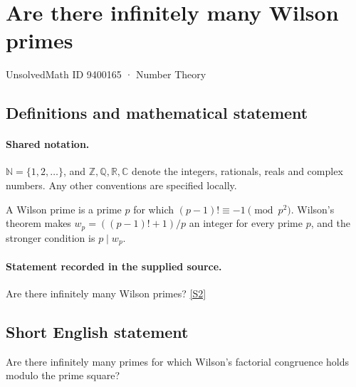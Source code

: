 \documentclass[11pt]{article}
\newcommand{\sref}[2]{\hyperlink{source:#1:#2}{[S#2]}}
\begin{document}
\setcounter{section}{9400164}
\section{Are there infinitely many Wilson primes}\label{9400165}
{\small\sffamily UnsolvedMath ID 9400165 · Number Theory}
\subsection{Definitions and mathematical statement}

\paragraph{Shared notation.}$\mathbb N=\{1,2,\ldots\}$, and $\mathbb Z,\mathbb Q,\mathbb R,\mathbb C$ denote the integers, rationals, reals and complex numbers. Any other conventions are specified locally.


A Wilson prime is a prime $p$ for which $(p-1)!\equiv-1\pmod{p^2}$. Wilson's theorem makes $w_p=((p-1)!+1)/p$ an integer for every prime $p$, and the stronger condition is $p\mid w_p$.
\paragraph{Statement recorded in the supplied source.}
Are there infinitely many Wilson primes? \sref{9400165}{2}
\subsection{Short English statement}
Are there infinitely many primes for which Wilson’s factorial congruence holds modulo the prime square?
\end{document}
